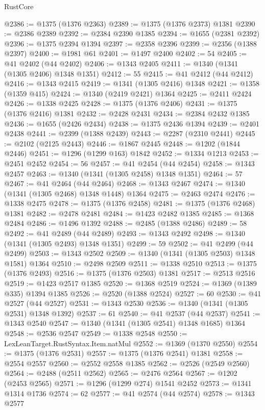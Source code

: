 \begin{lexlean}{RustCore}
\begin{coremodule}
@2386 := @1375 (@1376 @2363)
@2389 := @1375 (@1376 @2373) @1381
@2390 := @2386 @2389
@2392 := @2384 @2390 @1385
@2394 := @1655 (@2381 @2392)
@2396 := @1375 @2394 @1394
@2397 := @2358 @2396
@2399 := @2356 (@1388 @2397)
@2400 := @1981 @61
@2401 := @1497 @2400
@2402 := 54
@2405 := @41 @2402 (@44 @2402)
@2406 := @1343 @2405
@2411 := @1340 (@1341 (@1305 @2406) @1348 @1351)
@2412 := 55
@2415 := @41 @2412 (@44 @2412)
@2416 := @1343 @2415
@2419 := @1341 (@1305 @2416) @1348
@2421 := @1358 (@1359 @415)
@2424 := @1340 (@2419 @2421) @1364
@2425 := @2411 @2424
@2426 := @1338 @2425
@2428 := @1375 (@1376 @2406)
@2431 := @1375 (@1376 @2416) @1381
@2432 := @2428 @2431
@2434 := @2384 @2432 @1385
@2436 := @1655 (@2426 @2434)
@2438 := @1375 @2436 @1394
@2439 := @2401 @2438
@2441 := @2399 (@1388 @2439)
@2443 := @2287 (@2310 @2441)
@2445 := @2102 (@2125 @2443)
@2446 := @1867 @2445
@2448 := @1202 (@1844 @2446)
@2451 := @1296 (@1299 @163) @1842
@2452 := @1334 @1213
@2453 := @2451 @2452
@2454 := 56
@2457 := @41 @2454 (@44 @2454)
@2458 := @1343 @2457
@2463 := @1340 (@1341 (@1305 @2458) @1348 @1351)
@2464 := 57
@2467 := @41 @2464 (@44 @2464)
@2468 := @1343 @2467
@2474 := @1340 (@1341 (@1305 @2468) @1348 @1448) @1364
@2475 := @2463 @2474
@2476 := @1338 @2475
@2478 := @1375 (@1376 @2458)
@2481 := @1375 (@1376 @2468) @1381
@2482 := @2478 @2481
@2484 := @1423 @2482 @1385
@2485 := @1368 @2484
@2486 := @1496 @1392
@2488 := @2485 (@1388 @2486)
@2489 := 58
@2492 := @41 @2489 (@44 @2489)
@2493 := @1343 @2492
@2498 := @1340 (@1341 (@1305 @2493) @1348 @1351)
@2499 := 59
@2502 := @41 @2499 (@44 @2499)
@2503 := @1343 @2502
@2509 := @1340 (@1341 (@1305 @2503) @1348 @1581) @1364
@2510 := @2498 @2509
@2511 := @1338 @2510
@2513 := @1375 (@1376 @2493)
@2516 := @1375 (@1376 @2503) @1381
@2517 := @2513 @2516
@2519 := @1423 @2517 @1385
@2520 := @1368 @2519
@2524 := @1369 (@1389 @335) @1394 @1385
@2526 := @2520 (@1388 @2524)
@2527 := 60
@2530 := @41 @2527 (@44 @2527)
@2531 := @1343 @2530
@2536 := @1340 (@1341 (@1305 @2531) @1348 @1392)
@2537 := 61
@2540 := @41 @2537 (@44 @2537)
@2541 := @1343 @2540
@2547 := @1340 (@1341 (@1305 @2541) @1348 @1685) @1364
@2548 := @2536 @2547
@2549 := @1338 @2548
@2550 := LexLeanTarget.RustSyntax.Item.natMul
@2552 := @1369 (@1370 @2550)
@2554 := @1375 (@1376 @2531)
@2557 := @1375 (@1376 @2541) @1381
@2558 := @2554 @2557
@2560 := @2552 @2558 @1385
@2562 := @2526 (@2549 @2560)
@2564 := @2488 (@2511 @2562)
@2565 := @2476 @2564
@2567 := @1202 (@2453 @2565)
@2571 := @1296 (@1299 @274) @1541 @2452
@2573 := @1341 @1314 @1736
@2574 := 62
@2577 := @41 @2574 (@44 @2574)
@2578 := @1343 @2577

\end{coremodule}
\end{lexlean}
